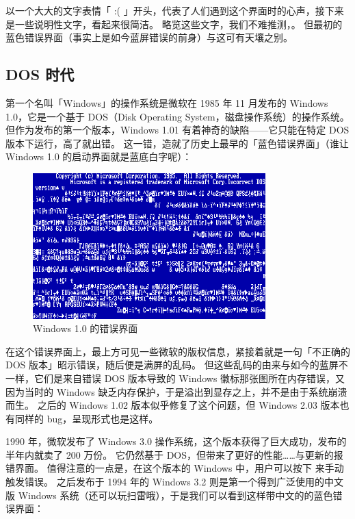 以一个大大的文字表情「 :( 」开头，代表了人们遇到这个界面时的心声，接下来是一些说明性文字，看起来很简洁。
略览这些文字，我们不难推测，。
但最初的蓝色错误界面（事实上是如今蓝屏错误的前身）与这可有天壤之别。

\subsection{DOS 时代}

第一个名叫「Windows」的操作系统是微软在 1985 年 11 月发布的 Windows 1.0，它是一个基于 DOS（Disk Operating System，磁盘操作系统）的操作系统。
但作为发布的第一个版本，Windows 1.01 有着神奇的缺陷——它只能在特定 DOS 版本下运行，高了就出错。
这一错，造就了历史上最早的「蓝色错误界面」（谁让 Windows 1.0 的启动界面就是蓝底白字呢）：

\begin{figure}[htb!]
  \centering
  \includegraphics[width=9cm]{assets/Win-1.0-Error.png}
  \caption{Windows 1.0 的错误界面}
  \label{Win-1.0-Error}
\end{figure}

在这个错误界面上，最上方可见一些微软的版权信息，紧接着就是一句「不正确的 DOS 版本」昭示错误，随后便是满屏的乱码。
但这些乱码的由来与如今的蓝屏不一样，它们是来自错误 DOS 版本导致的 Windows 徽标那张图所在内存错误，又因为当时的 Windows 缺乏内存保护，于是溢出到显存之上，并不是由于系统崩溃而生。
之后的 Windows 1.02 版本似乎修复了这个问题，但 Windows 2.03 版本也有同样的 bug，呈现形式也是这样。

1990 年，微软发布了 Windows 3.0 操作系统，这个版本获得了巨大成功，发布的半年内就卖了 200 万份。
它仍然基于 DOS，但带来了更好的性能……与更新的报错界面。
值得注意的一点是，在这个版本的 Windows 中，用户可以按下  来手动触发错误。
之后发布于 1994 年的 Windows 3.2 则是第一个得到广泛使用的中文版 Windows 系统（还可以玩扫雷哦），于是我们可以看到这样带中文的的蓝色错误界面：


